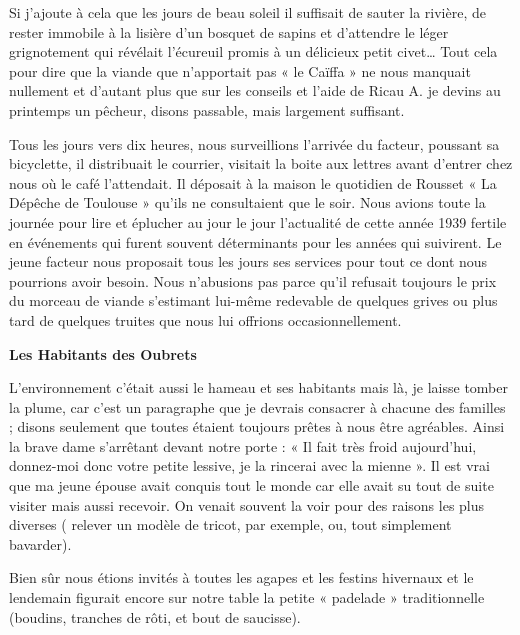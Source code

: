 
Si j’ajoute à cela que les jours de beau soleil il suffisait de sauter la rivière, de rester
immobile à la lisière d’un bosquet de sapins et d’attendre le léger grignotement qui
révélait l’écureuil promis à un délicieux petit civet… Tout cela pour dire que la
viande que n’apportait pas « le Caïffa » ne nous manquait nullement et d’autant plus
que sur les conseils et l’aide de Ricau A. je devins au printemps un pêcheur, disons
passable, mais largement suffisant.

Tous les jours vers dix heures, nous surveillions l’arrivée du facteur, poussant sa
bicyclette, il distribuait le courrier, visitait la boite aux lettres avant d’entrer chez
nous où le café l’attendait. Il déposait à la maison le quotidien de Rousset « La
Dépêche de Toulouse » qu’ils ne consultaient que le soir. Nous avions toute la
journée pour lire et éplucher au jour le jour l’actualité de cette année 1939 fertile en
événements qui furent souvent déterminants pour les années qui suivirent. Le jeune
facteur nous proposait tous les jours ses services pour tout ce dont nous pourrions
avoir besoin. Nous n’abusions pas parce qu’il refusait toujours le prix du morceau de
viande s’estimant lui-même redevable de quelques grives ou plus tard de quelques
truites que nous lui offrions occasionnellement.

\begin{center}
\textbf{Les Habitants des Oubrets}
\end{center}

L’environnement c’était aussi le hameau et ses habitants mais là, je laisse tomber la
plume, car c’est un paragraphe que je devrais consacrer à chacune des familles ;
disons seulement que toutes étaient toujours prêtes à nous être agréables. Ainsi la
brave dame s’arrêtant devant notre porte : « Il fait très froid aujourd’hui, donnez-moi
donc votre petite lessive, je la rincerai avec la mienne ». Il est vrai que ma jeune
épouse avait conquis tout le monde car elle avait su tout de suite visiter mais aussi
recevoir. On venait souvent la voir pour des raisons les plus diverses ( relever un
modèle de tricot, par exemple, ou, tout simplement bavarder).

Bien sûr nous étions invités à toutes les agapes et les festins hivernaux et le
lendemain figurait encore sur notre table la petite « padelade » traditionnelle
(boudins, tranches de rôti, et bout de saucisse).

